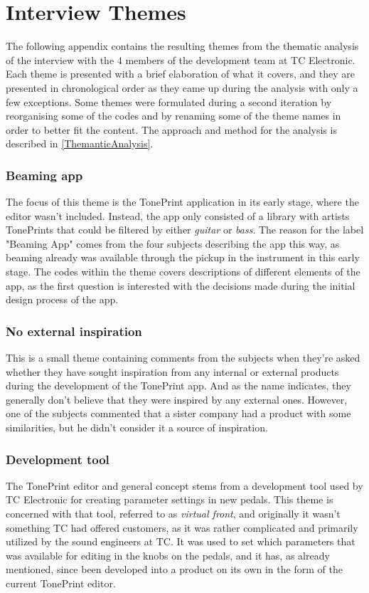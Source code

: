 \chapter{Interview Themes}
\label{App:Themes}
The following appendix contains the resulting themes from the thematic analysis of the interview with the 4 members of the development team at TC Electronic. Each theme is presented with a brief elaboration of what it covers, and they are presented in chronological order as they came up during the analysis with only a few exceptions. Some themes were formulated during a second iteration by reorganising some of the codes and by renaming some of the theme names in order to better fit the content. The approach and method for the analysis is described in \autoref{ThemanticAnalysis}.

\subsection*{Beaming app}
\label{App:ThemeBeamingApp}
The focus of this theme is the TonePrint application in its early stage, where the editor wasn't included. Instead, the app only consisted of a library with artists TonePrints that could be filtered by either \textit{guitar} or \textit{bass}. The reason for the label "Beaming App" comes from the four subjects describing the app this way, as beaming already was available through the pickup in the instrument in this early stage. The codes within the theme covers descriptions of different elements of the app, as the first question is interested with the decisions made during the initial design process of the app.

\subsection*{No external inspiration}
\label{App:ThemeNoExternalInspiration}
This is a small theme containing comments from the subjects when they're asked whether they have sought inspiration from any internal or external products during the development of the TonePrint app. And as the name indicates, they generally don't believe that they were inspired by any external ones. However, one of the subjects commented that a sister company had a product with some similarities, but he didn't consider it a source of inspiration.

\subsection*{Development tool}
\label{App:ThemeDevelopmentTool}
The TonePrint editor and general concept stems from a development tool used by TC Electronic for creating parameter settings in new pedals. This theme is concerned with that tool, referred to as \textit{virtual front}, and originally it wasn't something TC had offered customers, as it was rather complicated and primarily utilized by the sound engineers at TC. It was used to set which parameters that was available for editing in the knobs on the pedals, and it has, as already mentioned, since been developed into a product on its own in the form of the current TonePrint editor. 

